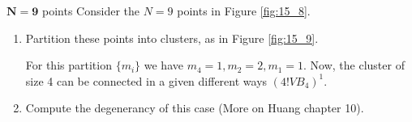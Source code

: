 \documentclass[../main/main.tex]{subfiles}
\begin{document}
\begin{figure}[h!]
\begin{minipage}[c]{0.5\linewidth}
\end{minipage}
\begin{minipage}[]{0.5\linewidth}
\centering
{}
\end{minipage}
\caption{\label{fig:} }
\end{figure}


\begin{exercise}{\( \pmb{N=9} \) points}{}
Consider the \( N=9 \) points in Figure \ref{fig:15_8}.
  \begin{enumerate}
  \item Partition these points into clusters, as in Figure \ref{fig:15_9}.

   For this partition \( \{ m_i \}   \) we have \( m_4=1,m_2=2,m_1=1 \). Now, the cluster of size 4 can be connected in a given different ways \( (4! V B_4)^1 \).
   \item Compute the degenerancy of this case (More on Huang chapter 10).
  \end{enumerate}
\end{exercise}
\end{document}
